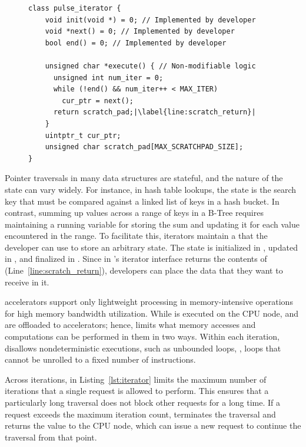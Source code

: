 \begin{figure}
\centering
\begin{lstlisting}[caption={\pulse interface.},label={lst:iterator},escapechar=|]
class pulse_iterator {
    void init(void *) = 0; // Implemented by developer
    void *next() = 0; // Implemented by developer
    bool end() = 0; // Implemented by developer
    
    unsigned char *execute() { // Non-modifiable logic
      unsigned int num_iter = 0;
      while (!end() && num_iter++ < MAX_ITER)
        cur_ptr = next();
      return scratch_pad;|\label{line:scratch_return}|
    }
    uintptr_t cur_ptr;
    unsigned char scratch_pad[MAX_SCRATCHPAD_SIZE];
}
\end{lstlisting}

\end{figure}

 Pointer traversals in many data structures are stateful, and the nature of the state can vary widely. For instance, in hash table lookups, the state is the search key that must be compared against a linked list of keys in a hash bucket. In contrast, summing up values across a range of keys in a B-Tree requires maintaining a running variable for storing the sum and updating it for each value encountered in the range. To facilitate this, \pulse iterators maintain a  that the developer can use to store an arbitrary state. The state is initialized in , updated in , and finalized in . Since  in \pulse's iterator interface returns the contents of  (Line~\ref{line:scratch_return}), developers can place the data that they want to receive in it.


 \pulse accelerators support only lightweight processing in memory-intensive operations for high memory bandwidth utilization. While  is executed on the CPU node,  and  are offloaded to \pulse accelerators; hence, \pulse limits what memory accesses and computations can be performed in them in two ways. Within each iteration, \pulse disallows nondeterministic executions, such as unbounded loops, \ie, loops that cannot be unrolled to a fixed number of instructions. 

Across iterations,  in Listing~\ref{lst:iterator} limits the maximum number of iterations that a single request is allowed to perform. This ensures that a particularly long traversal does not block other requests for a long time.  
If a request exceeds the maximum iteration count, \pulse terminates the traversal and returns the  value to the CPU node, which can issue a new request to continue the traversal from that point. 

